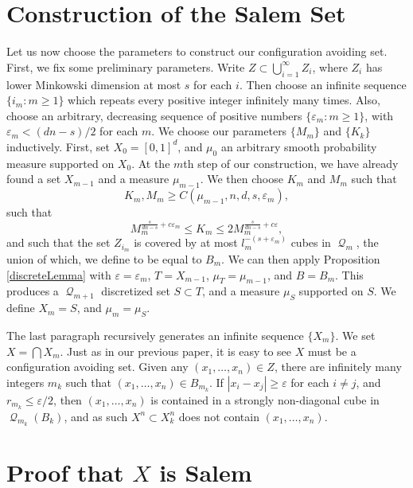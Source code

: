 \documentclass[12pt,reqno]{article}
\numberwithin{equation}{section}
\DeclareMathOperator{\DQ}{\mathcal{Q}}
\begin{document}
\section{Construction of the Salem Set}

Let us now choose the parameters to construct our configuration avoiding set. First, we fix some preliminary parameters. Write $Z \subset \bigcup_{i = 1}^\infty Z_i$, where $Z_i$ has lower Minkowski dimension at most $s$ for each $i$. Then choose an infinite sequence $\{ i_m : m \geq 1 \}$ which repeats every positive integer infinitely many times. Also, choose an arbitrary, decreasing sequence of positive numbers $\{ \varepsilon_m : m \geq 1 \}$, with $\varepsilon_m < (dn - s)/2$ for each $m$. We choose our parameters $\{ M_m \}$ and $\{ K_k \}$ inductively. First, set $X_0 = [0,1]^d$, and $\mu_0$ an arbitrary smooth probability measure supported on $X_0$. At the $m$th step of our construction, we have already found a set $X_{m-1}$ and a measure $\mu_{m-1}$. We then choose $K_m$ and $M_m$ such that
%
\[ K_m, M_m \geq C(\mu_{m-1}, n, d, s, \varepsilon_m), \]
%
such that
%
\[ M_m^{\frac{s}{dn-s} + c\varepsilon_m} \leq K_m \leq 2 M_m^{\frac{s}{dn-s} + c\varepsilon}, \]
%
and such that the set $Z_{i_m}$ is covered by at most $l_m^{-(s + \varepsilon_m)}$ cubes in $\DQ_m$, the union of which, we define to be equal to $B_m$. We can then apply Proposition \ref{discreteLemma} with $\varepsilon = \varepsilon_m$, $T = X_{m-1}$, $\mu_T = \mu_{m-1}$, and $B = B_m$. This produces a $\DQ_{m+1}$ discretized set $S \subset T$, and a measure $\mu_S$ supported on $S$. We define $X_m = S$, and $\mu_m = \mu_S$.

The last paragraph recursively generates an infinite sequence $\{ X_m \}$. We set $X = \bigcap X_m$. Just as in our previous paper, it is easy to see $X$ must be a configuration avoiding set. Given any $(x_1, \dots, x_n) \in Z$, there are infinitely many integers $m_k$ such that $(x_1, \dots, x_n) \in B_{m_k}$. If $|x_i - x_j| \geq \varepsilon$ for each $i \neq j$, and $r_{m_k} \leq \varepsilon/2$, then $(x_1, \dots, x_n)$ is contained in a strongly non-diagonal cube in $\DQ_{m_k}(B_k)$, and as such $X^n \subset X_k^n$ does not contain $(x_1, \dots, x_n)$.

\section{Proof that $X$ is Salem}
\end{document}
